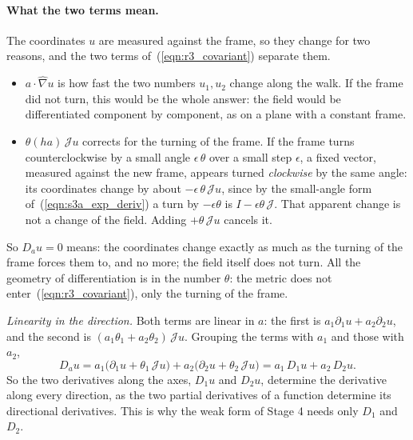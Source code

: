 \paragraph{What the two terms mean.} The coordinates $u$ are measured against the frame, so they change for two reasons, and the two terms of~(\ref{eqn:r3_covariant}) separate them.
\begin{itemize}
\item $a\cdot\hat\nabla u$ is how fast the two numbers $u_1, u_2$ change along the walk. If the frame did not turn, this would be the whole answer: the field would be differentiated component by component, as on a plane with a constant frame.
\item $\theta(ha)\,\mathcal Ju$ corrects for the turning of the frame. If the frame turns counterclockwise by a small angle $\epsilon\,\theta$ over a small step $\epsilon$, a fixed vector, measured against the new frame, appears turned \emph{clockwise} by the same angle: its coordinates change by about $-\epsilon\,\theta\,\mathcal J u$, since by the small-angle form of~(\ref{eqn:s3a_exp_deriv}) a turn by $-\epsilon\theta$ is $I - \epsilon\theta\,\mathcal J$. That apparent change is not a change of the field. Adding $+\theta\,\mathcal J u$ cancels it.
\end{itemize}
So $D_au = 0$ means: the coordinates change exactly as much as the turning of the frame forces them to, and no more; the field itself does not turn. All the geometry of differentiation is in the number $\theta$: the metric does not enter~(\ref{eqn:r3_covariant}), only the turning of the frame.

\emph{Linearity in the direction.} Both terms are linear in $a$: the first is $a_1\partial_1u + a_2\partial_2u$, and the second is $(a_1\theta_1 + a_2\theta_2)\,\mathcal Ju$. Grouping the terms with $a_1$ and those with $a_2$,
\begin{equation*}
D_au = a_1\big(\partial_1u + \theta_1\,\mathcal Ju\big) + a_2\big(\partial_2u + \theta_2\,\mathcal Ju\big) = a_1\, D_1u + a_2\, D_2u .
\end{equation*}
So the two derivatives along the axes, $D_1u$ and $D_2u$, determine the derivative along every direction, as the two partial derivatives of a function determine its directional derivatives. This is why the weak form of Stage 4 needs only $D_1$ and $D_2$.

